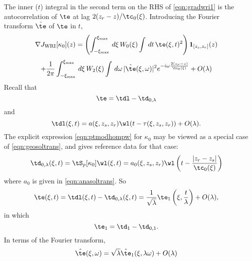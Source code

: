 The inner ($t$) integral in the second term on the RHS of
\ref{eqn:gradwri1} is the autocorrelation of $\te$ at lag
$2(z_r-z)/\tc_0(\xi)$. Introducing the Fourier transform $\hat{\te}$
of $\te$ in $t$,
\[
  \nabla J_{\rm WRI}[\kappa_0](z) = \left(\int_{-\xi_{\rm max}}^{\xi_{\rm max}}\,d\xi \,W_0(\xi)
    \int\,dt\, \te(\xi,t)^2\right) {\bf 1}_{[z_s,z_r]}(z)
\]
\begin{equation}
  \label{eqn:gradwri2}
  +\frac{1}{2\pi}\int_{-\xi_{\rm max}}^{\xi_{\rm max}}\,d\xi\,W_2(\xi)\int\,d\omega\, 
  |\hat{\te}(\xi,\omega)|^2e^{-i\omega\frac{2(z_r-z)}{\tc_0(\xi)}} + O(\lambda)
\end{equation}
Recall that
\[
  \te=\tdl -
  \td_{0,\lambda}
\]
and
\begin{equation}
  \label{eqn:geosoltrans1}
  \tdl(\xi,t) = a(\xi,z_s,z_r)\wl(t-\tau(\xi,z_s,z_r)) + O(\lambda). 
\end{equation}
The explicit expression \ref{eqn:ptmodhompw} for $\kappa_0$ may be 
viewed as a special case of \ref{eqn:geosoltrans}, and gives reference 
data for that case: 
\begin{equation}
  \label{eqn:analsoltrans1}
  \td_{0,\lambda}(\xi,t) =  \tS_p[\kappa_0]\wl(\xi,t)  = a_0(\xi,z_s,z_r)\wl 
  \left(t-\frac{|z_r-z_s|}{\tc_0(\xi)}\right) 
\end{equation}
where $a_0$ is given in \ref{eqn:anasoltrans}. So
\[
  \te(\xi,t) = \tdl(\xi,t)-\td_{0,\lambda}(\xi,t) =
  \frac{1}{\sqrt{\lambda}}\te_1\left(\xi,\frac{t}{\lambda}\right) + O(\lambda),
\]
in which
\begin{equation}
  \label{eqn:e1def}
  \te_1 = \td_1 -\td_{0,1}.
\end{equation}
In terms of the Fourier transform,
\[
  \hat{\te}(\xi,\omega) = \sqrt{\lambda}\hat{\te}_1(\xi,\lambda\omega)
  + O(\lambda)
\]

